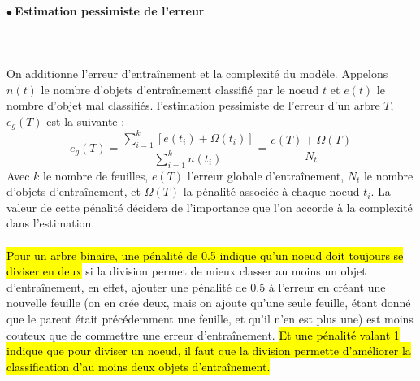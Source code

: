 \documentclass[letterpaper, 12pt]{article}
\newcommand{\point}{$\bullet\ $}
\begin{document}
			\paragraph{\point Estimation pessimiste de l'erreur}~\\~\\
				On additionne
				l'erreur d'entraînement et la complexité du modèle. 
				Appelons $n(t)$ le nombre d'objets d'entraînement classifié 
				par le noeud $t$ et $e(t)$ le nombre d'objet mal classifiés.
				l'estimation pessimiste de l'erreur d'un arbre $T$, $e_g(T)$
				est la suivante :
				$$ e_g(T) = \frac{\sum_{i=1}^{k}[e(t_i) + \Omega(t_i)]}%
				                 {\sum_{i=1}^{k}n(t_i)}
				          = \frac{e(T) + \Omega(T)}{N_t} $$
				Avec $k$ le nombre de feuilles, $e(T)$ 
				l'erreur globale d'entraînement, $N_t$ le nombre d'objets
				d'entraînement, et $\Omega(T)$ la pénalité associée à 
				chaque noeud $t_i$. La valeur de cette pénalité décidera
				de l'importance que l'on accorde à la complexité dans 
				l'estimation. \\
				~\\				
				\hl{Pour un arbre binaire, une pénalité de 0.5
				indique qu'un noeud doit toujours se diviser en deux}
				si la division permet de mieux classer au moins un objet 
				d'entraînement, en effet, ajouter une pénalité de 0.5
				à l'erreur en créant une nouvelle feuille 
				(on en crée deux, mais
				on ajoute qu'une seule feuille, étant donné que le parent 
				était précédemment une feuille, et qu'il n'en est plus une)
				est moins couteux que de commettre une erreur d'entraînement.
				\hl{Et une pénalité valant 1 indique que pour diviser un noeud,
				il faut que la division permette d'améliorer 
				la classification d'au moins deux objets d'entraînement.}
			\newpage
\end{document}
